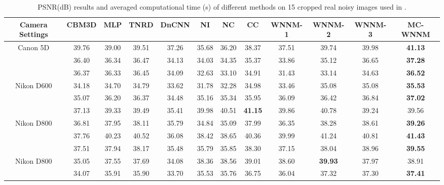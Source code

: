 



\begin{table}
\begin{adjustwidth}{-2cm}{}
\caption{PSNR(dB) results and averaged computational time (s) of different methods on 15 cropped real noisy images used in \cite{crosschannel2016}.}
\label{tab4-4}
\label{tabb}
\begin{center}
\renewcommand\arraystretch{1}
\scriptsize
\begin{tabular}{|c||c|c|c|c|c|c|c|c|c|c|c|}
\hline
Camera Settings  
&
\textbf{CBM3D}
&
\textbf{MLP}
&
\textbf{TNRD}
&
\textbf{DnCNN}
&
\textbf{NI}
&
\textbf{NC}
&
\textbf{CC}
&
\textbf{WNNM-1}
&
\textbf{WNNM-2}
&
\textbf{WNNM-3}
&
\textbf{MC-WNNM} 
\\
\hline
\multirow{3}{*}{\small{Canon 5D}} %
& 39.76 & 39.00 & 39.51 & 37.26 & 35.68 & 36.20 & 38.37 & 37.51 & 39.74 & 39.98 & \textbf{41.13}
\\ 
\cline{2-12} 
\multirow{3}{*}{ISO = 3200}   
& 36.40 & 36.34 & 36.47 & 34.13 & 34.03 & 34.35 & 35.37 & 33.86 & 35.12 & 36.65 & \textbf{37.28}
\\ 
\cline{2-12}    
& 36.37 & 36.33 & 36.45 & 34.09 & 32.63 & 33.10 & 34.91 & 31.43 & 33.14 & 34.63 & \textbf{36.52}  
\\
\hline
\multirow{3}{*}{Nikon D600} 
& 34.18 & 34.70 & 34.79 & 33.62 & 31.78 & 32.28 & 34.98 & 33.46 & 35.08 & 35.08 & \textbf{35.53}
\\ 
\cline{2-12} 
\multirow{3}{*}{ISO = 3200}   
& 35.07 & 36.20 & 36.37 & 34.48 & 35.16 & 35.34 & 35.95 & 36.09 & 36.42 & 36.84 & \textbf{37.02}
\\ 
\cline{2-12}    
& 37.13 & 39.33 & 39.49 & 35.41 & 39.98 & 40.51 & \textbf{41.15} & 39.86 & 40.78 & 39.24 & 39.56
\\
\hline
\multirow{3}{*}{Nikon D800} 
& 36.81  & 37.95 & 38.11 & 35.79 & 34.84 & 35.09 & 37.99 & 36.35 & 38.28 & 38.61 & \textbf{39.26}
\\ 
\cline{2-12} 
\multirow{3}{*}{ISO = 1600}   
& 37.76 & 40.23 & 40.52 & 36.08 & 38.42 & 38.65 & 40.36 & 39.99 & 41.24 & 40.81 & \textbf{41.43}
\\ 
\cline{2-12}    
& 37.51 & 37.94 & 38.17 & 35.48 & 35.79 & 35.85 & 38.30 & 37.15 & 38.04 & 38.96 & \textbf{39.55}
\\
\hline
\multirow{3}{*}{Nikon D800} 
& 35.05 & 37.55 & 37.69 & 34.08 & 38.36 & 38.56 & 39.01 & 38.60 & \textbf{39.93} & 37.97 & 38.91
\\ 
\cline{2-12} 
\multirow{3}{*}{ISO = 3200}   
& 34.07 & 35.91 & 35.90 & 33.70 & 35.53 & 35.76 & 36.75 & 36.04 & 37.32 & 37.30 & \textbf{37.41}

\end{tabular}
\end{center}
\end{adjustwidth}
\end{table}
